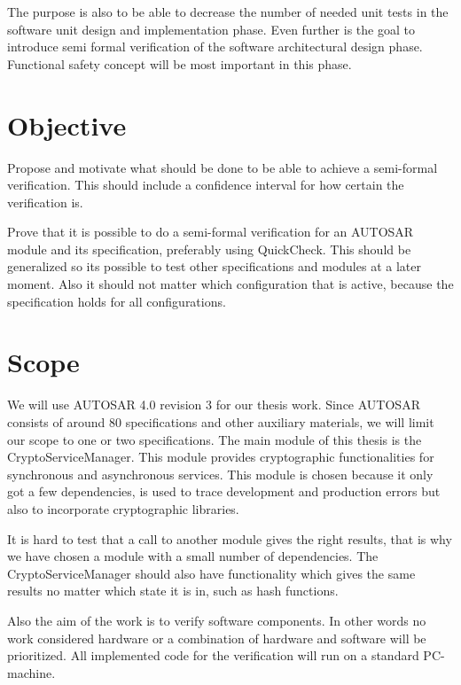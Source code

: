 The purpose is also to be able to decrease the number of needed unit tests in
the software unit design and implementation phase. Even further is the goal to
introduce semi formal verification of the software architectural design phase.
Functional safety concept will be most important in this phase.

\section{Objective}
Propose and motivate what should be done to be able to achieve a semi-formal
verification. This should include a confidence interval for how certain the
verification is.

Prove that it is possible to do a semi-formal verification for an AUTOSAR module
and its specification, preferably using QuickCheck. This should be generalized
so its possible to test other specifications and modules at a later moment.
Also it should not matter which configuration that is active, because the
specification holds for all configurations.

\section{Scope}
We will use AUTOSAR 4.0 revision 3 for our thesis work.
Since AUTOSAR consists of around 80 specifications and other auxiliary
materials\cite{AUTOSAR:URL}, we will limit our scope to one or two
specifications. The main module of this thesis is the CryptoServiceManager. This
module provides cryptographic functionalities for synchronous and asynchronous
services. This module is chosen because it only got a few dependencies, is used to trace
development and production errors but also to incorporate cryptographic
libraries.

It is hard to test that a call to another module gives the right results,
that is why we have chosen a module with a small number of
dependencies.
The CryptoServiceManager should also have functionality which gives the same
results no matter which state it is in, such as hash
functions\cite{SPEC:AUTOSAR:CSM}.

Also the aim of the work is to verify software components. In other words no
work considered hardware or a combination of hardware and software will be
prioritized. All implemented code for the verification will run on a standard
PC-machine.
